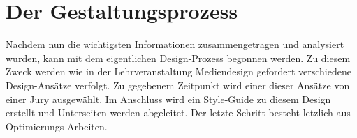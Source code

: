 \chapter{Der Gestaltungsprozess}
Nachdem nun die wichtigsten Informationen zusammengetragen und analysiert wurden, kann mit dem eigentlichen Design-Prozess begonnen werden. Zu diesem Zweck werden wie in der Lehrveranstaltung Mediendesign gefordert verschiedene Design-Ansätze verfolgt. Zu gegebenem Zeitpunkt wird einer dieser Ansätze von einer Jury ausgewählt. Im Anschluss wird ein Style-Guide zu diesem Design erstellt und Unterseiten werden abgeleitet. Der letzte Schritt besteht letzlich aus Optimierungs-Arbeiten.









